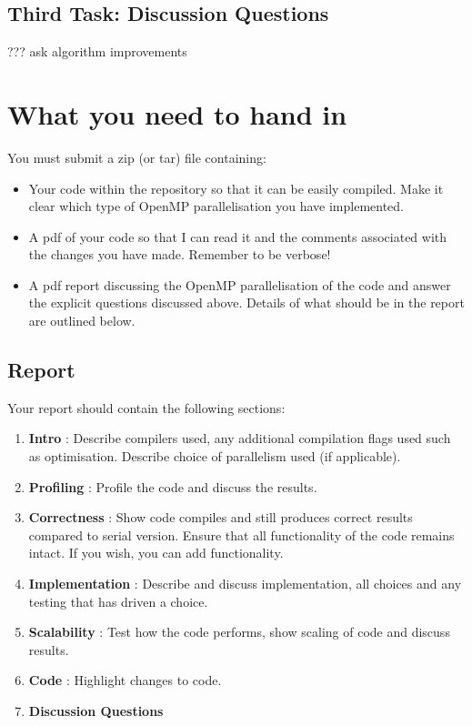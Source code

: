 \documentclass[11pt]{amsart}
\begin{document}
\subsection{{\color{Red}Third Task}: Discussion Questions\nopunct\\}\label{sec:tasks:discussion}
??? ask algorithm improvements 

\section{{\color{Blue}What you need to hand in\nopunct\\}}\label{sec:handin}

You must submit a zip (or tar) file containing:
\begin{itemize}
\item Your code within the repository so that it can be easily compiled. Make it clear which type of OpenMP parallelisation you have implemented.
\item A pdf of your code so that I can read it and the comments associated with the changes you have made. Remember to be verbose!
\item A pdf report discussing the OpenMP parallelisation of the code and answer the explicit questions discussed above. Details of what should be in the report are outlined below.
\end{itemize}

\subsection*{Report\nopunct\\}\label{sec:handin:report}
\noindent Your report should contain the following sections:
  \begin{enumerate}
  \item{\textbf{Intro} : Describe compilers used, any additional compilation flags used such as optimisation. Describe choice of parallelism used (if applicable).} 
  \item{\textbf{Profiling} : Profile the code and discuss the results.}
  \item{\textbf{Correctness} : Show code compiles and still produces correct results compared to serial version. Ensure that all functionality of the code remains intact. If you wish, you can add functionality.}
  \item{\textbf{Implementation} : Describe and discuss implementation, all choices and any testing that has driven a choice.}
  \item{\textbf{Scalability} : Test how the code performs, show scaling of code and discuss results.}
  \item{\textbf{Code} : Highlight changes to code.}
  \item{\textbf{Discussion Questions} }
\end{enumerate}
\end{document}
